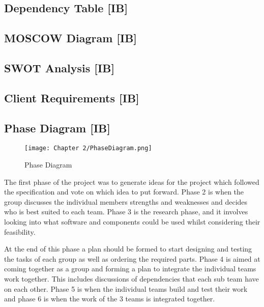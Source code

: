 \subsection{Dependency Table [IB]}


\subsection{MOSCOW Diagram [IB]}


\subsection{SWOT Analysis [IB]}


\subsection{Client Requirements [IB]}



\subsection{Phase Diagram [IB]}

\begin{figure}[H]        
    \centering
    \texttt{[image: Chapter 2/PhaseDiagram.png]}
    \caption{Phase Diagram}
    \label{fig:phasediag}
\end{figure} 

The first phase of the project was to generate ideas for the project which followed the specification and vote on which idea to put forward.
Phase 2 is when the group discusses the individual members strengths and weaknesses and decides who is best suited to each team.
Phase 3 is the research phase, and it involves looking into what software and components could be used whilst considering their feasibility.

At the end of this phase a plan should be formed to start designing and testing the tasks of each group as well as ordering the required parts.
Phase 4 is aimed at coming together as a group and forming a plan to integrate the individual teams work together.
This includes discussions of dependencies that each sub team have on each other.
Phase 5 is when the individual teams build and test their work and phase 6 is when the work of the 3 teams is integrated together.